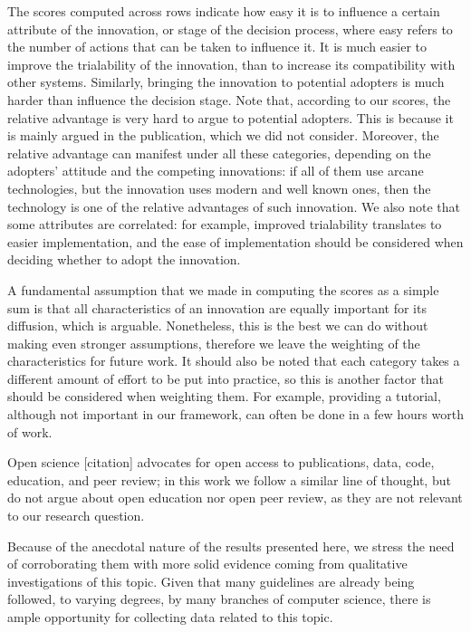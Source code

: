 \documentclass[12pt]{article}
\begin{document}
The scores computed across rows indicate how easy it is to influence a certain attribute of the innovation, or stage of the decision process, where easy refers to the number of actions that can be taken to influence it. It is much easier to improve the trialability of the innovation, than to increase its compatibility with other systems. Similarly, bringing the innovation to potential adopters is much harder than influence the decision stage. Note that, according to our scores, the relative advantage is very hard to argue to potential adopters. This is because it is mainly argued in the publication, which we did not consider. Moreover, the relative advantage can manifest under all these categories, depending on the adopters' attitude and the competing innovations: if all of them use arcane technologies, but the innovation uses modern and well known ones, then the technology is one of the relative advantages of such innovation. We also note that some attributes are correlated: for example, improved trialability translates to easier implementation, and the ease of implementation should be considered when deciding whether to adopt the innovation.

A fundamental assumption that we made in computing the scores as a simple sum is that all characteristics of an innovation are equally important for its diffusion, which is arguable. Nonetheless, this is the best we can do without making even stronger assumptions, therefore we leave the weighting of the characteristics for future work. It should also be noted that each category takes a different amount of effort to be put into practice, so this is another factor that should be considered when weighting them. For example, providing a tutorial, although not important in our framework, can often be done in a few hours worth of work.

Open science [citation] advocates for open access to publications, data, code, education, and peer review; in this work we follow a similar line of thought, but do not argue about open education nor open peer review, as they are not relevant to our research question.

Because of the anecdotal nature of the results presented here, we stress the need of corroborating them with more solid evidence coming from qualitative investigations of this topic. Given that many guidelines are already being followed, to varying degrees, by many branches of computer science, there is ample opportunity for collecting data related to this topic.
\end{document}
